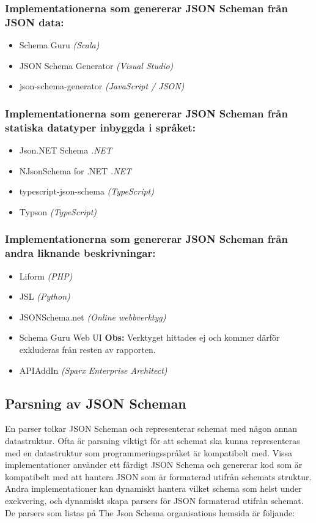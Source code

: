 \subsubsection{Implementationerna som genererar JSON Scheman från JSON data:}
\begin{itemize}
	\item Schema Guru \textit{(Scala)} \cite{Snowplow}
	\item JSON Schema Generator \textit{(Visual Studio)} \cite{MadsKristensen}
	\item json-schema-generator \textit{(JavaScript / JSON)} \cite{Romanovich}
\end{itemize}

\subsubsection{Implementationerna som genererar JSON Scheman från statiska datatyper inbyggda i språket:}
\begin{itemize}
	\item Json.NET Schema \textit{.NET} \cite{Newtonsoft}
	\item NJsonSchema for .NET \textit{.NET} \cite{Suter}
	\item typescript-json-schema \textit{(TypeScript)} \cite{El-Dardiry}
	\item Typson \textit{(TypeScript)} \cite{Bovet}
\end{itemize}

\subsubsection{Implementationerna som genererar JSON Scheman från andra liknande beskrivningar:}
\begin{itemize}
	\item Liform \textit{(PHP)} \cite{Limenius}
	\item JSL \textit{(Python)} \cite{Romanovich}
	\item JSONSchema.net \textit{(Online webbverktyg)} \cite{Bovet}
	\item Schema Guru Web UI \textbf{Obs:} Verktyget hittades ej och kommer därför exkluderas från resten av rapporten.
	\item APIAddIn \textit{(Sparx Enterprise Architect)} \cite{Tomlinson}
\end{itemize}

\subsection{Parsning av JSON Scheman}
\label{sec:teori:schema-användningsområden:parsning}
En parser tolkar JSON Scheman och representerar schemat med någon annan datastruktur. Ofta är parsning viktigt för att schemat ska kunna representeras med en datastruktur som programmeringsspråket är kompatibelt med. Vissa implementationer använder ett färdigt JSON Schema och genererar kod som är kompatibelt med att hantera JSON som är formaterad utifrån schemats struktur. Andra implementationer kan dynamiskt hantera vilket schema som helst under exekvering, och dynamiskt skapa parsers för JSON formaterad utifrån schemat. De parsers som listas på The Json Schema organisations hemsida är följande:

